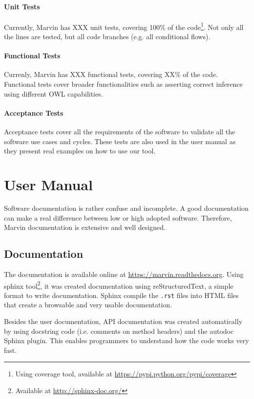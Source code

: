 \documentclass{report}
\begin{document}
\subsubsection{Unit Tests}

Currently, Marvin has XXX unit tests, covering 100\% of the code\footnote{Using coverage tool, available at \url{https://pypi.python.org/pypi/coverage}}.
Not only all the lines are tested, but all code branches (e.g. all conditional flows).

\subsubsection{Functional Tests}

Currenly, Marvin has XXX functional tests, covering XX\% of the code.
Functional tests cover broader functionalities such as asserting correct inference using different OWL capabilities.

\subsubsection{Acceptance Tests}

Acceptance tests cover all the requirements of the software to validate all the software use cases and cycles.
These tests are also used in the user manual \cite{manual} as they present real examples on how to use our tool.

\chapter{User Manual}
\label{manual}

Software documentation is rather confuse and incomplete.
A good documentation can make a real difference between low or high adopted software.
Therefore, Marvin documentation is extensive and well designed.

\section{Documentation}

The documentation is available online at \url{https://marvin.readthedocs.org}.
Using sphinx tool\footnote{Available at \url{http://sphinx-doc.org/}}, it was created documentation using
reStructuredText, a simple format to write documentation.
Sphinx compile the \texttt{.rst} files into HTML files that create a browsable and very usable documentation.

Besides the user documentation, API documentation was created automatically by using docstring code (i.e. comments on method headers) and
the autodoc Sphinx plugin.
This enables programmers to understand how the code works very fast.
\end{document}
